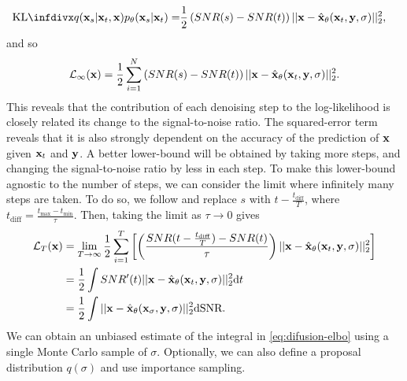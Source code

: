 \begin{align}
\kl{q(\rvx_{s} | \rvx_{t}, \rvx)}{p_\theta(\rvx_{s} | \rvx_{t})} = &\frac{1}{2} \left( SNR(s) - SNR(t) \right) || \rvx - \hat{\rvx}_\theta(\rvx_t, \rvy, \sigma) ||_2^2,
\end{align}
and so
\begin{align}
    \mathcal{L}_\infty({\mathbf{x}}) = \frac{1}{2} \sum_{i=1}^N \left( SNR(s) - SNR(t) \right) || {\mathbf{x}} - \hat{{\mathbf{x}}}_\theta({\mathbf{x}}_t, {\mathbf{y}}, \sigma) ||_2^2.
\end{align}
This reveals that the contribution of each denoising step to the log-likelihood is closely related its change to the signal-to-noise ratio. The squared-error term reveals that it is also strongly dependent on the accuracy of the prediction of ${\mathbf{x}}$ given ${\mathbf{x}}_t$ and ${\mathbf{y}}$. A better lower-bound will be obtained by taking more steps, and changing the signal-to-noise ratio by less in each step. To make this lower-bound agnostic to the number of steps, we can consider the limit where infinitely many steps are taken. To do so, we  follow \citet{kingma2021variational} and replace $s$ with $t-\frac{t_\text{diff}}{T}$, where $t_\text{diff} = \frac{t_\text{max}-t_\text{min}}{\tau}$. Then, taking the limit as $\tau \rightarrow 0$ gives 
\begin{align}
    \mathcal{L}_T({\mathbf{x}}) &= \lim_{T\rightarrow\infty} \frac{1}{2} \sum_{i=1}^T \left[ \left( \frac{SNR(t-\frac{t_\text{diff}}{T}) - SNR(t)}{\tau} \right) || {\mathbf{x}} - \hat{{\mathbf{x}}}_\theta({\mathbf{x}}_t, {\mathbf{y}}, \sigma) ||_2^2 \right] \\
    &= \frac{1}{2} \int SNR'(t) || {\mathbf{x}} - \hat{{\mathbf{x}}}_\theta({\mathbf{x}}_t, {\mathbf{y}}, \sigma) ||_2^2 \mathrm{d}t \label{eq:difusion-elbo} \\
    &= \frac{1}{2} \int || {\mathbf{x}} - \hat{{\mathbf{x}}}_\theta({\mathbf{x}}_\sigma, {\mathbf{y}}, \sigma) ||_2^2 \mathrm{d}\text{SNR}.
\end{align}
We can obtain an unbiased estimate of the integral in \cref{eq:difusion-elbo} using a single Monte Carlo sample of $\sigma$. Optionally, we can also define a proposal distribution $q(\sigma)$ and use importance sampling.


